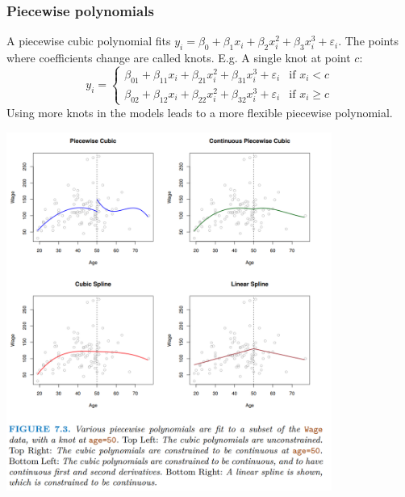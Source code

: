 \documentclass[11pt]{article}
\begin{document}
\subsubsection{Piecewise polynomials}
\noindent A piecewise cubic polynomial fits $y_i = \beta_0 + \beta_1 x_i + \beta_2x_i^2 + \beta_3 x_i^3 + \varepsilon_i$. The points where coefficients change are called knots. E.g. A single knot at point $c$:
\[
y_i =
\begin{cases}
\beta_{01} + \beta_{11}x_i + \beta_{21}x_i^2 + \beta_{31}x_i^3 + \varepsilon_i & \text{if } x_i < c \\
\beta_{02} + \beta_{12}x_i + \beta_{22}x_i^2 + \beta_{32}x_i^3 + \varepsilon_i & \text{if } x_i \geq c
\end{cases}
\]
\noindent Using more knots in the models leads to a more flexible piecewise polynomial.
\begin{center}
  \includegraphics[width=0.8\textwidth]{Regression Splines Visualisations.png}
\end{center}
\end{document}
